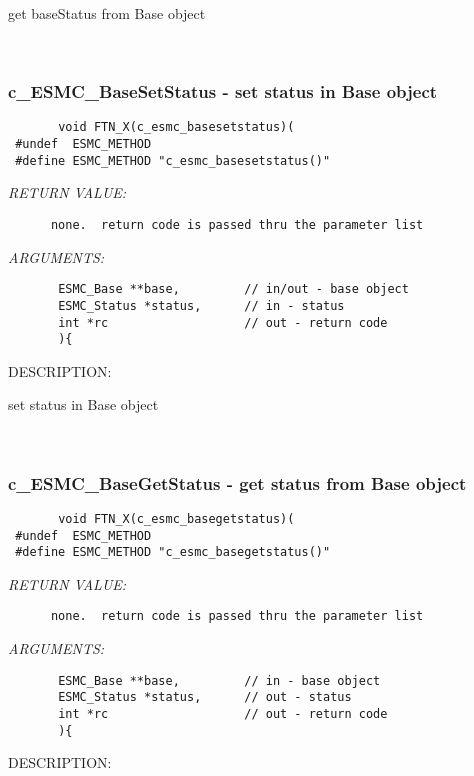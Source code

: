        get baseStatus from Base object
   
 
\mbox{}\hrulefill\
 
\subsubsection [c\_ESMC\_BaseSetStatus] {c\_ESMC\_BaseSetStatus - set status in Base object}


  
\begin{verbatim}       void FTN_X(c_esmc_basesetstatus)(
 #undef  ESMC_METHOD
 #define ESMC_METHOD "c_esmc_basesetstatus()"\end{verbatim}{\em RETURN VALUE:}
\begin{verbatim}      none.  return code is passed thru the parameter list
   \end{verbatim}{\em ARGUMENTS:}
\begin{verbatim}       ESMC_Base **base,         // in/out - base object
       ESMC_Status *status,      // in - status
       int *rc                   // out - return code
       ){
   \end{verbatim}
{\sf DESCRIPTION:\\ }


       set status in Base object
   
 
\mbox{}\hrulefill\
 
\subsubsection [c\_ESMC\_BaseGetStatus] {c\_ESMC\_BaseGetStatus - get status from Base object}


  
\begin{verbatim}       void FTN_X(c_esmc_basegetstatus)(
 #undef  ESMC_METHOD
 #define ESMC_METHOD "c_esmc_basegetstatus()"\end{verbatim}{\em RETURN VALUE:}
\begin{verbatim}      none.  return code is passed thru the parameter list
   \end{verbatim}{\em ARGUMENTS:}
\begin{verbatim}       ESMC_Base **base,         // in - base object
       ESMC_Status *status,      // out - status
       int *rc                   // out - return code
       ){
   \end{verbatim}
{\sf DESCRIPTION:\\ }


